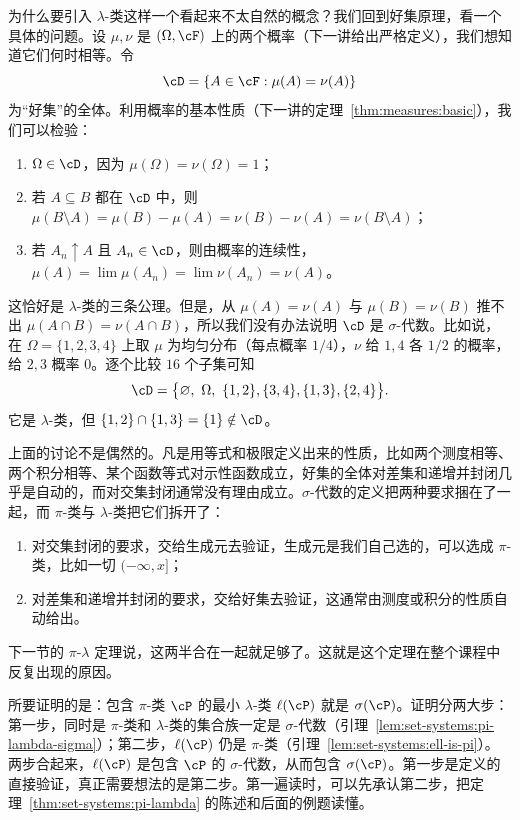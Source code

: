 为什么要引入 $\lambda$-类这样一个看起来不太自然的概念？我们回到好集原理，看一个具体的问题。设 $\mu,\nu$ 是 $(\Omega,\cF)$ 上的两个概率（下一讲给出严格定义），我们想知道它们何时相等。令
\[
\cD=\{A\in\cF: \mu(A)=\nu(A)\}
\]
为“好集”的全体。利用概率的基本性质（下一讲的定理~\ref{thm:measures:basic}），我们可以检验：
\begin{enumerate}
\item $\Omega\in\cD$，因为 $\mu(\Omega)=\nu(\Omega)=1$；
\item 若 $A\subseteq B$ 都在 $\cD$ 中，则 $\mu(B\setminus A)=\mu(B)-\mu(A)=\nu(B)-\nu(A)=\nu(B\setminus A)$；
\item 若 $A_n\uparrow A$ 且 $A_n\in\cD$，则由概率的连续性，$\mu(A)=\lim\mu(A_n)=\lim\nu(A_n)=\nu(A)$。
\end{enumerate}
这恰好是 $\lambda$-类的三条公理。但是，从 $\mu(A)=\nu(A)$ 与 $\mu(B)=\nu(B)$ 推不出 $\mu(A\cap B)=\nu(A\cap B)$，所以我们没有办法说明 $\cD$ 是 $\sigma$-代数。比如说，在 $\Omega=\{1,2,3,4\}$ 上取 $\mu$ 为均匀分布（每点概率 $1/4$），$\nu$ 给 $1,4$ 各 $1/2$ 的概率，给 $2,3$ 概率 $0$。逐个比较 $16$ 个子集可知
\[
\cD=\bigl\{\varnothing,\ \Omega,\ \{1,2\},\{3,4\},\{1,3\},\{2,4\}\bigr\}.
\]
它是 $\lambda$-类，但 $\{1,2\}\cap\{1,3\}=\{1\}\notin\cD$。

\begin{remark}
上面的讨论不是偶然的。凡是用等式和极限定义出来的性质，比如两个测度相等、两个积分相等、某个函数等式对示性函数成立，好集的全体对差集和递增并封闭几乎是自动的，而对交集封闭通常没有理由成立。$\sigma$-代数的定义把两种要求捆在了一起，而 $\pi$-类与 $\lambda$-类把它们拆开了：
\begin{enumerate}
\item 对交集封闭的要求，交给生成元去验证，生成元是我们自己选的，可以选成 $\pi$-类，比如一切 $(-\infty,x]$；
\item 对差集和递增并封闭的要求，交给好集去验证，这通常由测度或积分的性质自动给出。
\end{enumerate}
下一节的 $\pi$-$\lambda$ 定理说，这两半合在一起就足够了。这就是这个定理在整个课程中反复出现的原因。
\end{remark}


\begin{remark}[证明思路]
所要证明的是：包含 $\pi$-类 $\cP$ 的最小 $\lambda$-类 $\ell(\cP)$ 就是 $\sigma(\cP)$。证明分两大步：第一步，同时是 $\pi$-类和 $\lambda$-类的集合族一定是 $\sigma$-代数（引理~\ref{lem:set-systems:pi-lambda-sigma}）；第二步，$\ell(\cP)$ 仍是 $\pi$-类（引理~\ref{lem:set-systems:ell-is-pi}）。两步合起来，$\ell(\cP)$ 是包含 $\cP$ 的 $\sigma$-代数，从而包含 $\sigma(\cP)$。第一步是定义的直接验证，真正需要想法的是第二步。第一遍读时，可以先承认第二步，把定理~\ref{thm:set-systems:pi-lambda} 的陈述和后面的例题读懂。
\end{remark}


